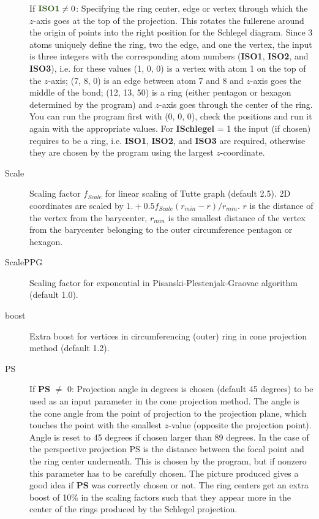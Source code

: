\documentclass[article,a4paper,twoside]{memoir}
\newcommand{\paramname}[1]{{\color{green}\textbf{#1}}}
\begin{document}
\begin{description}
  If $\paramname{ISO1} \ne 0$: Specifying the ring center, edge or vertex through which the $z$-axis goes at the top of the projection. This rotates
  the fullerene around the origin of points into the right position for the Schlegel diagram. Since 3 atoms
  uniquely define the ring, two the edge, and one the vertex, the input is three integers with the corresponding
  atom numbers  (\paramname{ISO1}, \paramname{ISO2}, and \paramname{ISO3}), i.e. for these values (1, 0, 0) is a vertex with atom 1 on the top of the $z$-axis;
  (7, 8, 0) is an edge between atom 7 and 8 and $z$-axis goes the middle of the bond; (12, 13, 50) is a ring (either pentagon or hexagon determined
  by the program) and $z$-axis goes through the center of the ring. You can run the program first with (0, 0, 0), check the positions
  and run it again with the appropriate values. For \paramname{ISchlegel} = 1 the input (if chosen) requires to be a ring, i.e.
  \paramname{ISO1}, \paramname{ISO2}, and \paramname{ISO3} are required, otherwise they are chosen by the program using the largest $z$-coordinate.\\
\item[Scale] 
  Scaling factor $f_{Scale}$ for linear scaling of Tutte graph (default  2.5). 2D coordinates are scaled by 
  $1.+0.5f_{Scale}(r_{min}-r)/r_{min}$. $r$ is the distance of the vertex from the barycenter, $r_{min}$ is the smallest distance of the vertex 
  from the barycenter belonging to the outer circumference pentagon or hexagon.
\item[ScalePPG] 
  Scaling factor for exponential in Pisanski-Plestenjak-Graovac algorithm \cite{pisanski95} (default 1.0).
\item[boost] 
  Extra boost for vertices in circumferencing (outer) ring in cone projection method (default 1.2).
\item[PS] 
  If \paramname{PS} $\ne$ 0: Projection angle in degrees is chosen (default 45 degrees)
to be used as an input parameter in the cone projection method. The angle is the cone angle from the point of projection 
to the projection plane, which touches the point with the smallest $z$-value (opposite the projection point). Angle is reset 
to 45 degrees if chosen larger than 89 degrees.  In the case of the perspective projection PS is the distance
between the focal point and the ring center underneath.  This is chosen by the program, but if nonzero this parameter has to be
carefully chosen. The picture produced gives a good idea if \paramname{PS} was correctly chosen or not. The ring centers get
an extra boost of 10\% in the scaling factors such that they appear more in the center of the rings produced by the Schlegel projection.

\end{description}
\end{document}
